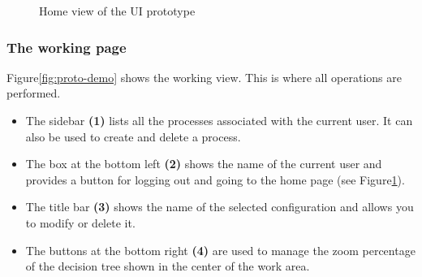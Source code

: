     \begin{figure}[h]
    \centering
    \caption{\label{fig:proto-home}  Home view of the UI prototype}
    \end{figure}
    
    
    \subsubsection{The working page}
    Figure\ref{fig:proto-demo} shows the working view. This is where all operations are performed. 
    
    \begin{itemize}
        \item The sidebar \textbf{(1)} lists all the processes associated with the current user. It can also be used to create and delete a process.
        \item The box at the bottom left \textbf{(2)} shows the name of the current user and provides a button for logging out and going to the home page (see Figure\ref{fig:proto-home}).
        \item The title bar \textbf{(3)} shows the name of the selected configuration and allows you to modify or delete it.
        \item The buttons at the bottom right \textbf{(4)} are used to manage the zoom percentage of the decision tree shown in the center of the work area.
    \end{itemize}
    
